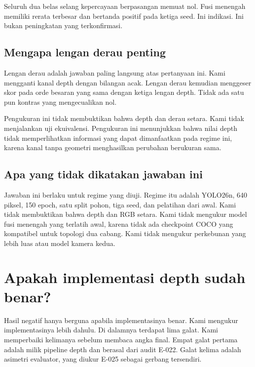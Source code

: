 \documentclass[preprint,12pt]{elsarticle}
\newcommand{\E}[1]{E-#1}
\begin{document}
Seluruh dua belas selang kepercayaan berpasangan memuat nol. Fusi menengah
memiliki rerata terbesar dan bertanda positif pada ketiga seed. Ini indikasi.
Ini bukan peningkatan yang terkonfirmasi.

\subsection{Mengapa lengan derau penting}

Lengan derau adalah jawaban paling langsung atas pertanyaan ini. Kami mengganti
kanal depth dengan bilangan acak. Lengan derau kemudian menggeser skor pada
orde besaran yang sama dengan ketiga lengan depth. Tidak ada satu pun kontras
yang mengecualikan nol.

Pengukuran ini tidak membuktikan bahwa depth dan derau setara. Kami tidak
menjalankan uji ekuivalensi. Pengukuran ini menunjukkan bahwa nilai depth tidak
memperlihatkan informasi yang dapat dimanfaatkan pada regime ini, karena kanal
tanpa geometri menghasilkan perubahan berukuran sama.

\subsection{Apa yang tidak dikatakan jawaban ini}

Jawaban ini berlaku untuk regime yang diuji. Regime itu adalah YOLO26n, 640
piksel, 150 epoch, satu split pohon, tiga seed, dan pelatihan dari awal. Kami
tidak membuktikan bahwa depth dan RGB setara. Kami tidak mengukur model fusi
menengah yang terlatih awal, karena tidak ada checkpoint COCO yang kompatibel
untuk topologi dua cabang. Kami tidak mengukur perkebunan yang lebih luas atau
model kamera kedua.

\section{Apakah implementasi depth sudah benar?}
\label{sec:implementation}

Hasil negatif hanya berguna apabila implementasinya benar. Kami mengukur
implementasinya lebih dahulu. Di dalamnya terdapat lima galat. Kami memperbaiki
kelimanya sebelum membaca angka final. Empat galat pertama adalah milik pipeline
depth dan berasal dari audit \E{022}. Galat kelima adalah asimetri evaluator,
yang diukur \E{025} sebagai gerbang tersendiri.
\end{document}
